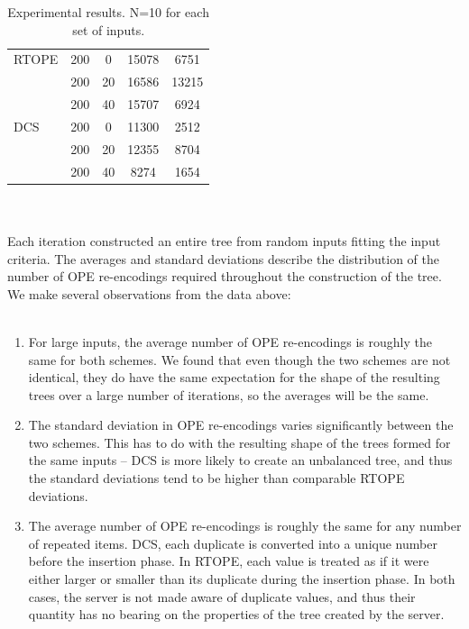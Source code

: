 \documentclass[12pt]{article}
\begin{document}
\begin{table}
\begin{tabular}{l c c c c}
      \midrule
RTOPE & 200 & 0  & 15078 & 6751 \\
      & 200 & 20  & 16586 & 13215\\
      & 200 & 40  & 15707 & 6924\\
      \midrule
DCS   & 200 & 0  & 11300 & 2512 \\
      & 200 & 20  & 12355 & 8704\\
      & 200 & 40  & 8274 & 1654\\
\bottomrule %
\end{tabular}
\caption{Experimental results. N=10 for each set of inputs.} %
\label{tab:results_table} %
\end{table} \\ \\
Each iteration constructed an entire tree from random inputs fitting the input criteria. The averages and standard deviations describe the distribution of the number of OPE re-encodings required throughout the construction of the tree. We make several observations from the data above:  \\ \\
\begin{enumerate}
\item For large inputs, the average number of OPE re-encodings is roughly the same for both schemes. We found that even though the two schemes are not identical, they do have the same expectation for the shape of the resulting trees over a large number of iterations, so the averages will be the same.
\item The standard deviation in OPE re-encodings varies significantly between the two schemes. This has to do with the resulting shape of the trees formed for the same inputs -- DCS is more likely to create an unbalanced tree, and thus the standard deviations tend to be higher than comparable RTOPE deviations.
\item
The average number of OPE re-encodings is roughly the same for any number of repeated items. DCS, each duplicate is converted into a unique number before the insertion phase. In RTOPE, each value is treated as if it were either larger or smaller than its duplicate during the insertion phase. In both cases, the server is not made aware of duplicate values, and thus their quantity has no bearing on the properties of the tree created by the server.
\end{enumerate}
\end{document}

